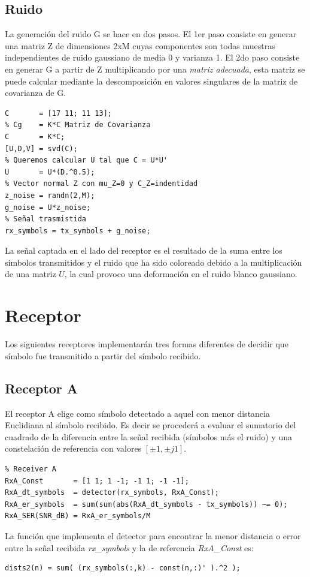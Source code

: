 \documentclass	[12pt,A4paper,titlepage]{article}
\begin{document}
\subsection{Ruido}
La generación del ruido G se hace en dos pasos. El 1er paso consiste en generar una matriz Z de dimensiones 2xM cuyas componentes son todas muestras independientes de ruido gaussiano de media 0 y varianza 1. El 2do paso consiste en generar G a partir de Z multiplicando por una \textit{matriz adecuada}, esta matriz se puede calcular mediante la descomposición en valores singulares de la matriz de covarianza de G.
\begin{verbatim}
C       = [17 11; 11 13];
% Cg    = K*C Matriz de Covarianza 
C       = K*C;
[U,D,V] = svd(C);  
% Queremos calcular U tal que C = U*U'
U       = U*(D.^0.5);
% Vector normal Z con mu_Z=0 y C_Z=indentidad
z_noise = randn(2,M); 
g_noise = U*z_noise; 
% Señal trasmistida
rx_symbols = tx_symbols + g_noise;
\end{verbatim}
La señal captada en el lado del receptor es el resultado de la suma entre los símbolos transmitidos y el ruido que ha sido coloreado debido a la multiplicación de una matriz $U$, la cual provoco una deformación en el ruido blanco gaussiano.


\section{Receptor}
Los siguientes receptores implementarán tres formas diferentes de decidir que símbolo fue transmitido a partir del símbolo recibido.
\subsection{Receptor A}
El receptor A elige como símbolo detectado a aquel con menor distancia Euclidiana al símbolo recibido. Es decir se procederá a evaluar el sumatorio del cuadrado de la diferencia entre la señal recibida (símbolos más el ruido) y una constelación de referencia con valores $[\pm1,\pm j1]$.
\begin{verbatim}
% Receiver A
RxA_Const       = [1 1; 1 -1; -1 1; -1 -1];
RxA_dt_symbols  = detector(rx_symbols, RxA_Const);
RxA_er_symbols  = sum(sum(abs(RxA_dt_symbols - tx_symbols)) ~= 0);
RxA_SER(SNR_dB) = RxA_er_symbols/M
\end{verbatim}
La función que implementa el detector para encontrar la menor distancia o error entre la señal recibida \textit{rx\_symbols} y la de referencia  \textit{RxA\_Const} es:
\begin{verbatim}
dists2(n) = sum( (rx_symbols(:,k) - const(n,:)' ).^2 );
\end{verbatim}
\end{document}
